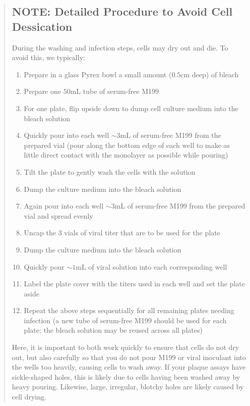 \begin{quotation}
	\subsection*{NOTE: Detailed Procedure to Avoid Cell Dessication}
	
	During the washing and infection steps, cells may dry out and die. To avoid this, we typically:
	
	\begin{enumerate}
		\item Prepare in a glass Pyrex bowl a small amount ($0.5$cm deep) of bleach
		\item Prepare one $50$mL tube of serum-free M199
		\item For one plate, flip upside down to dump cell culture medium into the bleach solution
		\item Quickly pour into each well $\sim 3$mL of serum-free M199 from the prepared vial (pour along the bottom edge of each well to make as little direct contact with the monolayer as possible while pouring)
		\item Tilt the plate to gently wash the cells with the solution
		\item Dump the culture medium into the bleach solution
		\item Again pour into each well $\sim 3$mL of serum-free M199 from the prepared vial and spread evenly
		\item Uncap the 3 vials of viral titer that are to be used for the plate
		\item Dump the culture medium into the bleach solution
		\item Quickly pour $\sim 1$mL of viral solution into each corresponding well
		\item Label the plate cover with the titers used in each well and set the plate aside
		\item Repeat the above steps sequentially for all remaining plates needing infection (a new tube of serum-free M199 should be used for each plate; the bleach solution may be reused across all plates)
	\end{enumerate}
	
	Here, it is important to both work quickly to ensure that cells do not dry out, but also carefully so that you do not pour M199 or viral inoculant into the wells too heavily, causing cells to wash away. If your plaque assays have sickle-shaped holes, this is likely due to cells having been washed away by heavy pouring. Likewise, large, irregular, blotchy holes are likely caused by cell drying.
\end{quotation}

